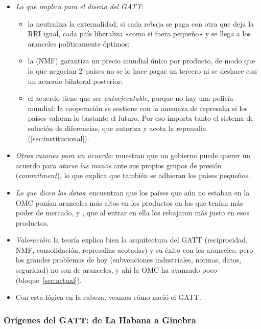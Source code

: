 \documentclass[11pt]{article}
\begin{document}
\begin{itemize}
\item \emph{Lo que implica para el diseño del GATT}:
  \begin{itemize}
  \item la  neutraliza la externalidad: si cada rebaja se paga con otra que deja la RRI igual, cada país liberaliza «como si fuera pequeño» y se llega a los aranceles políticamente óptimos;
  \item la  (NMF) garantiza un precio mundial único por producto, de modo que lo que negocian 2~países no se lo hace pagar un tercero ni se deshace con un acuerdo bilateral posterior;
  \item el acuerdo tiene que ser \emph{autoejecutable}, porque no hay una policía mundial: la cooperación se sostiene con la amenaza de represalia si los países valoran lo bastante el futuro. Por eso importa tanto el sistema de solución de diferencias, que autoriza y acota la represalia (\ref{sec:institucional}).
  \end{itemize}
\item \emph{Otras razones para un acuerdo}: \textcite{MaggiRodriguezClare1998Value} muestran que un gobierno puede querer un acuerdo para \emph{atarse las manos} ante sus propios grupos de presión (\emph{commitment}), lo que explica que también se adhieran los países pequeños.
\item \emph{Lo que dicen los datos}: \textcite{BrodaLimaoWeinstein2008Optimal} encuentran que los países que aún no estaban en la OMC ponían aranceles más altos en los productos en los que tenían más poder de mercado, y \textcite{BagwellStaiger2011Negotiators}, que al entrar en ella los rebajaron más justo en esos productos.
\item \emph{Valoración}: la teoría explica bien la arquitectura del GATT (reciprocidad, NMF, consolidación, represalias acotadas) y su éxito con los aranceles; pero los grandes problemas de hoy (subvenciones industriales, normas, datos, seguridad) no son de aranceles, y ahí la OMC ha avanzado poco (bloque~\ref{sec:actual}).
\item Con esta lógica en la cabeza, veamos cómo nació el GATT.
\end{itemize}


\subsubsection{Orígenes del GATT: de La Habana a Ginebra}\label{sec:origenes}
\end{document}
